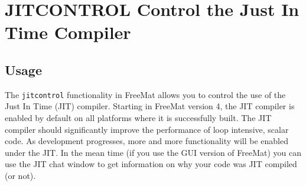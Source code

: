 \section{JITCONTROL Control the Just In Time Compiler}

\subsection{Usage}

The \verb|jitcontrol| functionality in FreeMat allows you to control
the use of the Just In Time (JIT) compiler.  Starting in FreeMat
version 4, the JIT compiler is enabled by default on all platforms
where it is successfully built.  The JIT compiler should significantly
improve the performance of loop intensive, scalar code.  As development
progresses, more and more functionality will be enabled under the JIT.
In the mean time (if you use the GUI version of FreeMat) you can use
the JIT chat window to get information on why your code was JIT compiled
(or not).
